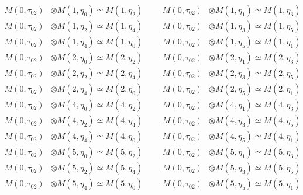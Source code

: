 \begin{align*}
M(0,\tau_{02}) &\otimes M(1,\eta_{0}) \simeq M(1,\eta_{2}) &&& M(0,\tau_{02}) &\otimes M(1,\eta_{1}) \simeq M(1,\eta_{3})\\
M(0,\tau_{02}) &\otimes M(1,\eta_{2}) \simeq M(1,\eta_{4}) &&& M(0,\tau_{02}) &\otimes M(1,\eta_{3}) \simeq M(1,\eta_{5})\\
M(0,\tau_{02}) &\otimes M(1,\eta_{4}) \simeq M(1,\eta_{0}) &&& M(0,\tau_{02}) &\otimes M(1,\eta_{5}) \simeq M(1,\eta_{1})\\
M(0,\tau_{02}) &\otimes M(2,\eta_{0}) \simeq M(2,\eta_{2}) &&& M(0,\tau_{02}) &\otimes M(2,\eta_{1}) \simeq M(2,\eta_{3})\\
M(0,\tau_{02}) &\otimes M(2,\eta_{2}) \simeq M(2,\eta_{4}) &&& M(0,\tau_{02}) &\otimes M(2,\eta_{3}) \simeq M(2,\eta_{5})\\
M(0,\tau_{02}) &\otimes M(2,\eta_{4}) \simeq M(2,\eta_{0}) &&& M(0,\tau_{02}) &\otimes M(2,\eta_{5}) \simeq M(2,\eta_{1})\\
M(0,\tau_{02}) &\otimes M(4,\eta_{0}) \simeq M(4,\eta_{2}) &&& M(0,\tau_{02}) &\otimes M(4,\eta_{1}) \simeq M(4,\eta_{3})\\
M(0,\tau_{02}) &\otimes M(4,\eta_{2}) \simeq M(4,\eta_{4}) &&& M(0,\tau_{02}) &\otimes M(4,\eta_{3}) \simeq M(4,\eta_{5})\\
M(0,\tau_{02}) &\otimes M(4,\eta_{4}) \simeq M(4,\eta_{0}) &&& M(0,\tau_{02}) &\otimes M(4,\eta_{5}) \simeq M(4,\eta_{1})\\
M(0,\tau_{02}) &\otimes M(5,\eta_{0}) \simeq M(5,\eta_{2}) &&& M(0,\tau_{02}) &\otimes M(5,\eta_{1}) \simeq M(5,\eta_{3})\\
M(0,\tau_{02}) &\otimes M(5,\eta_{2}) \simeq M(5,\eta_{4}) &&& M(0,\tau_{02}) &\otimes M(5,\eta_{3}) \simeq M(5,\eta_{5})\\
M(0,\tau_{02}) &\otimes M(5,\eta_{4}) \simeq M(5,\eta_{0}) &&& M(0,\tau_{02}) &\otimes M(5,\eta_{5}) \simeq M(5,\eta_{1})\\
\end{align*}

